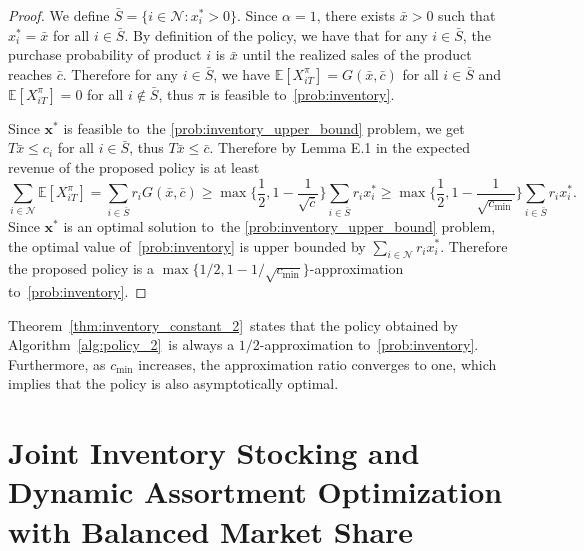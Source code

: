 \documentclass[mnsc,non-blindrev]{informs3}
\theoremstyle{definition}
\begin{document}
\begin{appendices}{\Large{}}
\begin{proof}
We define $\bar{S}=\{i\in\mathcal{N}:x^*_i>0\}$. Since $\alpha=1$, there exists $\bar{x}>0$ such that $x^*_i=\bar{x}$ for all $i\in\bar{S}$. By definition of the policy, we have that for any $i\in\bar{S}$, the purchase probability of product $i$ is $\bar{x}$ until the realized sales of the product reaches $\bar{c}$. Therefore for any $i\in\bar{S}$, we have $\mathbb{E}[X_{iT}^\pi]=G(\bar{x},\bar{c})$ for all $i\in\bar{S}$ and $\mathbb{E}[X_{iT}^\pi]=0$ for all $i\notin\bar{S}$, thus $\pi$ is feasible to~\ref{prob:inventory}.

Since $\bm{x}^*$ is feasible to~the \ref{prob:inventory_upper_bound} problem, we get $T\bar{x}\leq c_i$ for all $i\in\bar{S}$, thus $T\bar{x}\leq \bar{c}$. Therefore by Lemma E.1 in \cite{bai2022coordinated} the expected revenue of the proposed policy is at least 
\begin{equation*}
\sum_{i\in \mathcal{N}}\mathbb{E}[X_{iT}^\pi]=\sum_{i\in\bar{S}}r_iG(\bar{x},\bar{c})\geq \max\Big\{\dfrac{1}{2},1-\dfrac{1}{\sqrt{\bar{c}}}\Big\}\sum_{i\in\bar{S}}r_ix_i^*\geq \max\Big\{\dfrac{1}{2},1-\dfrac{1}{\sqrt{c_{\min}}}\Big\}\sum_{i\in\bar{S}}r_ix_i^*.
\end{equation*}
Since $\bm{x}^*$ is an optimal solution to~the \ref{prob:inventory_upper_bound} problem, the optimal value of~\ref{prob:inventory} is upper bounded by $\sum_{i\in\mathcal{N}}r_ix_i^*$. Therefore the proposed policy is a $\max\{{1}/{2},1-{1}/{\sqrt{c_{\min}}}\}$-approximation to~\ref{prob:inventory}.
\end{proof}

Theorem~\ref{thm:inventory_constant_2}~states that the policy obtained by Algorithm~\ref{alg:policy_2}~is always a $1/2$-approximation to~\ref{prob:inventory}. Furthermore, as $c_{\min}$ increases, the approximation ratio converges to one, which implies that the policy is also asymptotically optimal.

{ 

\section{Joint Inventory Stocking and Dynamic Assortment Optimization with Balanced Market Share}\label{sec:joint_inventory_assortment}

}
\end{appendices}
\end{document}
